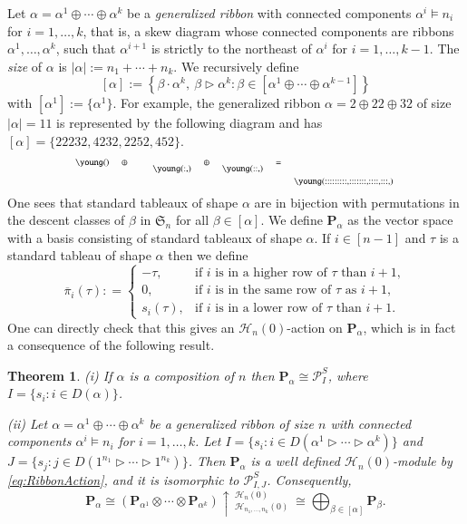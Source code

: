 \documentclass{amsart}
\newtheorem{theorem}{Theorem}[section]
\newtheorem*{Young's Rule}{Young's Rule}
\theoremstyle{definition}
\theoremstyle{remark}
\numberwithin{equation}{section}
\begin{document}
Let $\alpha=\alpha^1 \oplus \cdots \oplus \alpha^k$ be a \emph{generalized ribbon} with connected components $\alpha^i\models n_i$ for $i=1,\ldots,k$, that is, a skew diagram whose connected components are ribbons $\alpha^1,\ldots,\alpha^k$, such that $\alpha^{i+1}$ is strictly to the northeast of $\alpha^i$ for $i=1,\ldots,k-1$. The \emph{size} of $\alpha$ is $|\alpha|:=n_1+\cdots+n_k$. We recursively define 
\[ [\alpha] := \left \{\beta\cdot\alpha^k,\ \beta\rhd\alpha^k: \beta\in [\alpha^1\oplus\cdots\oplus\alpha^{k-1}] \right\} \]
with $[\alpha^1]:=\{\alpha^1\}$. For example, the generalized ribbon $\alpha=2\oplus22\oplus32$ of size $|\alpha|=11$ is represented by the following diagram and has $[\alpha]=\{22232,4232,2252,452\}$.
\[\scriptsize
\begin{matrix}
\young(\hfill\hfill) & \oplus & 
& \raisebox{-5pt}{\young(:\hfill\hfill,\hfill\hfill)} & \oplus &
\raisebox{-5pt}{\young(::\hfill\hfill,\hfill\hfill\hfill)} & = & 
\raisebox{-15pt}{\young(:::::::::\hfill\hfill,:::::::\hfill\hfill\hfill,::::\hfill\hfill,:::\hfill\hfill,\hfill\hfill) }
\end{matrix} \]
One sees that standard tableaux of shape $\alpha$ are in bijection with permutations in the descent classes of $\beta$ in ${{\mathfrak S}}_n$ for all $\beta\in[\alpha]$. We define ${\mathbf{P}}_\alpha$ as the vector space with a basis consisting of standard tableaux of shape $\alpha$. If $i\in[n-1]$ and $\tau$ is a standard tableau of shape $\alpha$ then we define
\begin{equation}\label{eq:RibbonAction}
{\overline{\pi}}_i(\tau): = \begin{cases}
-\tau, &  \textrm{if $i$ is in a higher row of $\tau$ than $i+1$},\\
0, & \textrm{if $i$ is in the same row of $\tau$ as $i+1$}, \\
s_i(\tau), & \textrm{if $i$ is in a lower row of $\tau$ than $i+1$}.
\end{cases}
\end{equation}
One can directly check that this gives an ${\mathcal{H}}_n(0)$-action on ${\mathbf{P}}_\alpha$, which is in fact a consequence of the following result.

\begin{theorem}\label{thm:IndP}
(i) If $\alpha$ is a composition of $n$ then ${\mathbf{P}}_\alpha \cong {\mathcal{P}}_I^S$, where $I=\{s_i:i\in D(\alpha)\}$.

\noindent (ii) Let $\alpha=\alpha^1 \oplus \cdots \oplus \alpha^k$ be a generalized ribbon of size $n$ with connected components $\alpha^i\models n_i$ for $i=1,\ldots,k$. Let $I=\{s_i: i\in D(\alpha^1\rhd\cdots\rhd \alpha^k)\}$ and $J=\{s_j:j\in D(1^{n_1}\rhd\cdots\rhd 1^{n_k}) \}$. Then ${\mathbf{P}}_\alpha$ is a well defined ${\mathcal{H}}_n(0)$-module by \eqref{eq:RibbonAction}, and it is isomorphic to ${\mathcal{P}_{I,J}^S}$. Consequently,
\[
{\mathbf{P}}_\alpha \cong \left({\mathbf{P}}_{\alpha^1}\otimes\cdots\otimes {\mathbf{P}}_{\alpha^k}\right)
\uparrow\,_{{\mathcal{H}}_{n_1,\ldots,n_k}(0)}^{{\mathcal{H}}_n(0)}\ \cong
\bigoplus_{\beta\in[\alpha]}{\mathbf{P}}_\beta.
\]
\end{theorem}
\end{document}
